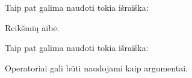 \documentclass[letterpaper,10pt,lithuanian]{sphinxmanual}
\begin{document}
\begin{fulllineitems}
\label{\detokenize{formules:func.set}}
\pysigstartsignatures
{}
\pysigstopsignatures
\sphinxAtStartPar
Taip pat galima naudoti tokia išraiška:

\begin{sphinxVerbatim}[commandchars=\\\{\}]
 
\end{sphinxVerbatim}

\sphinxAtStartPar
Reikšmių aibė.

\end{fulllineitems}


\begin{fulllineitems}
\label{\detokenize{formules:func.op}}
\pysigstartsignatures
{}
\pysigstopsignatures
\sphinxAtStartPar
Taip pat galima naudoti tokia išraiška:

\begin{sphinxVerbatim}[commandchars=\\\{\}]
\end{sphinxVerbatim}

\sphinxAtStartPar
Operatoriai gali būti naudojami kaip argumentai.

\end{fulllineitems}

\end{document}

